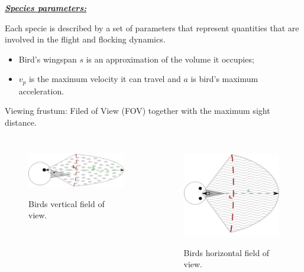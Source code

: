 \documentclass{beamer}
\begin{document}
\begin{frame}
\underline{\textbf{\textit{Species parameters: }}}

Each specie is described by a set of parameters that represent
quantities that are involved in the flight and flocking dynamics.
\begin{itemize}
\item Bird's wingspan $s$ is  an approximation of the
volume it occupies;
\item $v_p$ is the maximum velocity it can travel
and $a$ is bird's maximum acceleration.
\end{itemize}
Viewing frustum: Filed of View (FOV) together with the maximum sight distance.
\begin{center}
\begin{columns}
\begin{figure}[h!]
		\includegraphics[scale=0.23]{images/verticalFow}
		\label{fig:vFOV}
		\caption{Birds vertical field of view. }
\end{figure}	

\begin{figure}[h]
\centering
\includegraphics[scale=0.17]{images/hFow}
	\label{fig:hFOV}
	\caption{Birds horizontal field of view. }
\end{figure}
\end{columns}
\end{center}
\end{frame}
\end{document}
